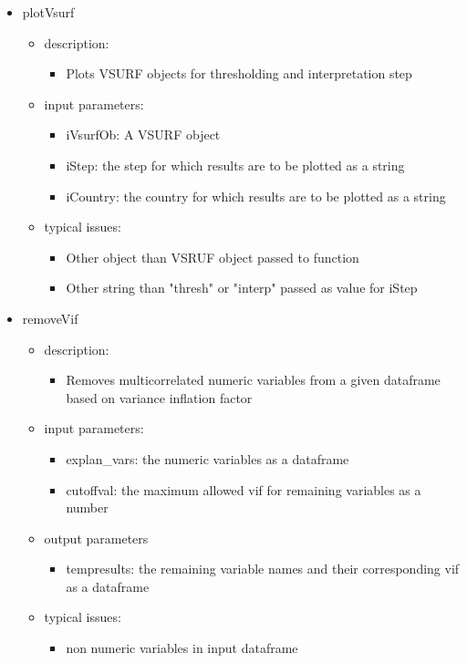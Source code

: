 \documentclass[12pt,a4paper,english]{article}
\begin{document}
\begin{itemize}
\item plotVsurf
	\begin{itemize}
	\item description: 
		\begin{itemize}
		\item Plots VSURF objects for thresholding and interpretation step
		\end{itemize}
	\item input parameters: 
		\begin{itemize}
		\item iVsurfOb: A VSURF object
		\item iStep: the step for which results are to be plotted as a string 
		\item iCountry: the country for which results are to be plotted as a string  
		\end{itemize}
	\item typical issues:
		\begin{itemize}
		\item Other object than VSRUF object passed to function
		\item Other string than "thresh" or "interp" passed as value for iStep
		\end{itemize}
	\end{itemize}

\item removeVif
	\begin{itemize}
	\item description: 
		\begin{itemize}
		\item Removes multicorrelated numeric variables from a given dataframe based on variance inflation factor
		\end{itemize}
	\item input parameters: 
		\begin{itemize}
		\item explan\_vars: the numeric variables as a dataframe
		\item cutoffval: the maximum allowed vif for remaining variables as a number
		\end{itemize}
	\item output parameters
		\begin{itemize}
		\item tempresults: the remaining variable names and their corresponding vif as a dataframe
		\end{itemize}
	\item typical issues:
		\begin{itemize}
		\item non numeric variables in input dataframe
		\end{itemize}
	\end{itemize}


\end{itemize}
\end{document}
